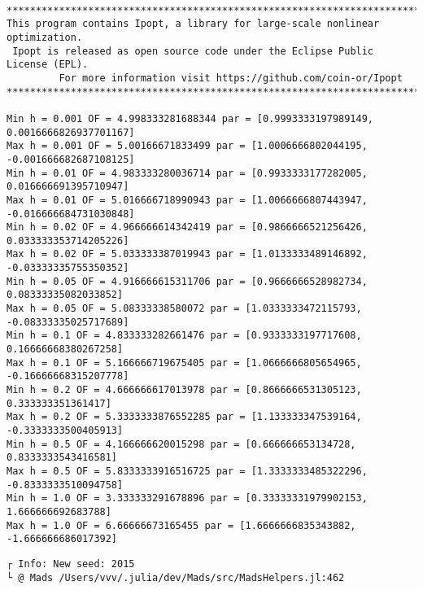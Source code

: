 \documentclass[11pt]{article}
\begin{document}
    \begin{Verbatim}[commandchars=\\\{\}]

******************************************************************************
This program contains Ipopt, a library for large-scale nonlinear optimization.
 Ipopt is released as open source code under the Eclipse Public License (EPL).
         For more information visit https://github.com/coin-or/Ipopt
******************************************************************************

Min h = 0.001 OF = 4.998333281688344 par = [0.9993333197989149,
0.0016666826937701167]
Max h = 0.001 OF = 5.00166671833499 par = [1.0006666802044195,
-0.001666682687108125]
Min h = 0.01 OF = 4.983333280036714 par = [0.9933333177282005,
0.016666691395710947]
Max h = 0.01 OF = 5.016666718990943 par = [1.0066666807443947,
-0.016666684731030848]
Min h = 0.02 OF = 4.966666614342419 par = [0.9866666521256426,
0.033333353714205226]
Max h = 0.02 OF = 5.033333387019943 par = [1.0133333489146892,
-0.03333335755350352]
Min h = 0.05 OF = 4.916666615311706 par = [0.9666666528982734,
0.08333335082033852]
Max h = 0.05 OF = 5.08333338580072 par = [1.0333333472115793,
-0.08333335025717689]
Min h = 0.1 OF = 4.833333282661476 par = [0.9333333197717608,
0.16666668380267258]
Max h = 0.1 OF = 5.166666719675405 par = [1.0666666805654965,
-0.16666668315207778]
Min h = 0.2 OF = 4.666666617013978 par = [0.8666666531305123, 0.333333351361417]
Max h = 0.2 OF = 5.3333333876552285 par = [1.133333347539164,
-0.3333333500405913]
Min h = 0.5 OF = 4.166666620015298 par = [0.666666653134728, 0.8333333543416581]
Max h = 0.5 OF = 5.8333333916516725 par = [1.3333333485322296,
-0.8333333510094758]
Min h = 1.0 OF = 3.333333291678896 par = [0.33333331979902153,
1.666666692683788]
Max h = 1.0 OF = 6.66666673165455 par = [1.6666666835343882, -1.666666686017392]
    \end{Verbatim}

    \begin{Verbatim}[commandchars=\\\{\}]
┌ Info: New seed: 2015
└ @ Mads /Users/vvv/.julia/dev/Mads/src/MadsHelpers.jl:462
    \end{Verbatim}
\end{document}
